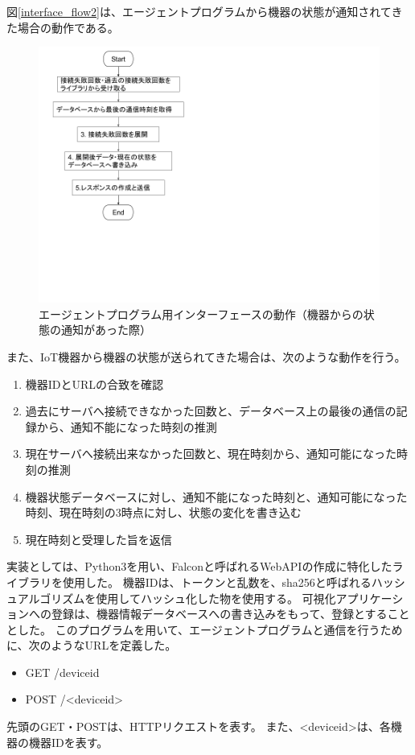 図\ref{interface_flow2}は、エージェントプログラムから機器の状態が通知されてきた場合の動作である。
\begin{figure}[htbp]
\includegraphics[width=16cm]{images/interface_flow2.png}
\caption{エージェントプログラム用インターフェースの動作（機器からの状態の通知があった際）}
\label{fig:interface_flow2}
\end{figure}

また、IoT機器から機器の状態が送られてきた場合は、次のような動作を行う。
\begin{enumerate}
\item 機器IDとURLの合致を確認
\item 過去にサーバへ接続できなかった回数と、データベース上の最後の通信の記録から、通知不能になった時刻の推測
\item 現在サーバへ接続出来なかった回数と、現在時刻から、通知可能になった時刻の推測
\item 機器状態データベースに対し、通知不能になった時刻と、通知可能になった時刻、現在時刻の3時点に対し、状態の変化を書き込む
\item 現在時刻と受理した旨を返信
\end{enumerate}

実装としては、Python3を用い、Falconと呼ばれるWebAPIの作成に特化したライブラリを使用した。
機器IDは、トークンと乱数を、sha256と呼ばれるハッシュアルゴリズムを使用してハッシュ化した物を使用する。
可視化アプリケーションへの登録は、機器情報データベースへの書き込みをもって、登録とすることとした。
このプログラムを用いて、エージェントプログラムと通信を行うために、次のようなURLを定義した。
\begin{itemize}
	\item GET /deviceid
	\item POST /<deviceid>
\end{itemize}
先頭のGET・POSTは、HTTPリクエストを表す。
また、<deviceid>は、各機器の機器IDを表す。

